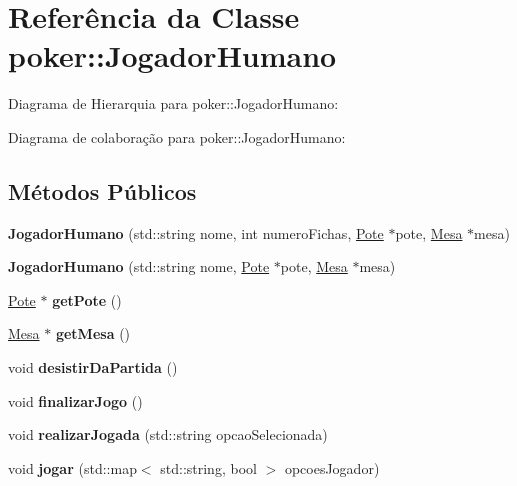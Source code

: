 \hypertarget{classpoker_1_1JogadorHumano}{}\section{Referência da Classe poker\+:\+:Jogador\+Humano}
\label{classpoker_1_1JogadorHumano}


Diagrama de Hierarquia para poker\+:\+:Jogador\+Humano\+:


Diagrama de colaboração para poker\+:\+:Jogador\+Humano\+:
\subsection*{Métodos Públicos}
\begin{DoxyCompactItemize}
\item 
\mbox{\label{classpoker_1_1JogadorHumano_a88ef6fb84ff5097eddcff4b3aed6844e}} 
{\bfseries Jogador\+Humano} (std\+::string nome, int numero\+Fichas, \hyperlink{classpoker_1_1Pote}{Pote} $\ast$pote, \hyperlink{classpoker_1_1Mesa}{Mesa} $\ast$mesa)
\item 
\mbox{\label{classpoker_1_1JogadorHumano_a1764352684a9bd0378d90c0a3a089c6f}} 
{\bfseries Jogador\+Humano} (std\+::string nome, \hyperlink{classpoker_1_1Pote}{Pote} $\ast$pote, \hyperlink{classpoker_1_1Mesa}{Mesa} $\ast$mesa)
\item 
\mbox{\label{classpoker_1_1JogadorHumano_a76c18b714372f6a7424764fea4f9a3b9}} 
\hyperlink{classpoker_1_1Pote}{Pote} $\ast$ {\bfseries get\+Pote} ()
\item 
\mbox{\label{classpoker_1_1JogadorHumano_ac9d250921d0c6f8f807f300216a3cc98}} 
\hyperlink{classpoker_1_1Mesa}{Mesa} $\ast$ {\bfseries get\+Mesa} ()
\item 
\mbox{\label{classpoker_1_1JogadorHumano_af7354b5679c8e8467159cfbabd80ffef}} 
void {\bfseries desistir\+Da\+Partida} ()
\item 
\mbox{\label{classpoker_1_1JogadorHumano_aeb47d06f4df0db0e2ddd4214e04a6fc6}} 
void {\bfseries finalizar\+Jogo} ()
\item 
\mbox{\label{classpoker_1_1JogadorHumano_a45e51a41baaacbb5f5bb9bc7808a7d1f}} 
void {\bfseries realizar\+Jogada} (std\+::string opcao\+Selecionada)
\item 
\mbox{\label{classpoker_1_1JogadorHumano_a3b84f579fcb9937bf4b8e6a050b9b3a4}} 
void {\bfseries jogar} (std\+::map$<$ std\+::string, bool $>$ opcoes\+Jogador)
\end{DoxyCompactItemize}
